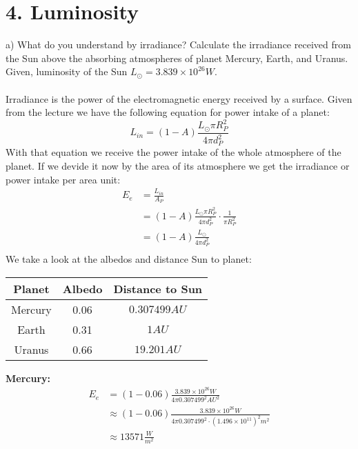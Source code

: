 \section*{4. Luminosity}

a) What do you understand by irradiance? Calculate the irradiance received from the Sun above the 
absorbing atmospheres of planet Mercury, Earth, and Uranus. Given, luminosity of the Sun 
$L_\odot = 3.839 \times 10^{26}W$.\\
\\
Irradiance is the power of the electromagnetic energy received by a surface. Given from the lecture we
have the following equation for power intake of a planet:
\begin{equation*}
    L_{in} = (1 - A) \frac{L_\odot \pi R^2_P}{4 \pi d^2_P}
\end{equation*}
With that equation we receive the power intake of the whole atmosphere of the planet. If we devide it now
by the area of its atmosphere we get the irradiance or power intake per area unit:
\begin{equation*}
    \begin{split}
        E_e &= \frac{L_{in}}{A_P}\\
            &= (1 - A) \frac{L_\odot \pi R^2_P}{4 \pi d^2_P} \cdot \frac{1}{\pi R^2_P}\\
            &= (1 - A) \frac{L_\odot}{4 \pi d^2_P}\\
    \end{split}
\end{equation*}
We take a look at the albedos and distance Sun to planet: 
\begin{center}
    \begin{tabular}{c|c|c}
        Planet & Albedo & Distance to Sun\\
        \hline
        Mercury & 0.06 & $0.307499 AU$\\
        \hline
        Earth & 0.31 & $1 AU$\\
        \hline
        Uranus & 0.66 & $19.201 AU$\\
    \end{tabular}
\end{center}
\textbf{Mercury:}
\begin{equation*}
    \begin{split}
        E_e &= (1 - 0.06) \frac{3.839 \times 10^{26}W}{4 \pi 0.307499^2 AU^2}\\
            &\approx (1 - 0.06) \frac{3.839 \times 10^{26}W}{4 \pi 0.307499^2 \cdot (1.496 \times 10^{11})^2 m^2}\\
            &\approx 13571 \frac{W}{m^2}
    \end{split}
\end{equation*}
